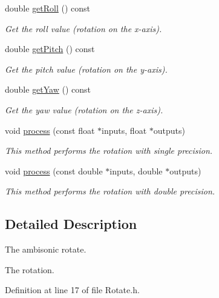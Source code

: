 \begin{DoxyCompactItemize}
double \hyperlink{class_hoa3_d_1_1_rotate_a4da29df01f2c7311490df11d4322b5f8}{get\-Roll} () const 
\begin{DoxyCompactList}\small\item\em Get the roll value (rotation on the x-\/axis). \end{DoxyCompactList}\item 
double \hyperlink{class_hoa3_d_1_1_rotate_afe1e5ccea5d375b082b7df2b8c8b972a}{get\-Pitch} () const 
\begin{DoxyCompactList}\small\item\em Get the pitch value (rotation on the y-\/axis). \end{DoxyCompactList}\item 
double \hyperlink{class_hoa3_d_1_1_rotate_a386f1fba4ceab4c2e243b7a222124d7e}{get\-Yaw} () const 
\begin{DoxyCompactList}\small\item\em Get the yaw value (rotation on the z-\/axis). \end{DoxyCompactList}\item 
void \hyperlink{class_hoa3_d_1_1_rotate_a9851055e9dbe808578e435c65f22c06a}{process} (const float $\ast$inputs, float $\ast$outputs)
\begin{DoxyCompactList}\small\item\em This method performs the rotation with single precision. \end{DoxyCompactList}\item 
void \hyperlink{class_hoa3_d_1_1_rotate_a395dafa6cc2d92562e6ac8044a438b2c}{process} (const double $\ast$inputs, double $\ast$outputs)
\begin{DoxyCompactList}\small\item\em This method performs the rotation with double precision. \end{DoxyCompactList}\end{DoxyCompactItemize}


\subsection{Detailed Description}
The ambisonic rotate. 

The rotation. 

Definition at line 17 of file Rotate.\-h.



